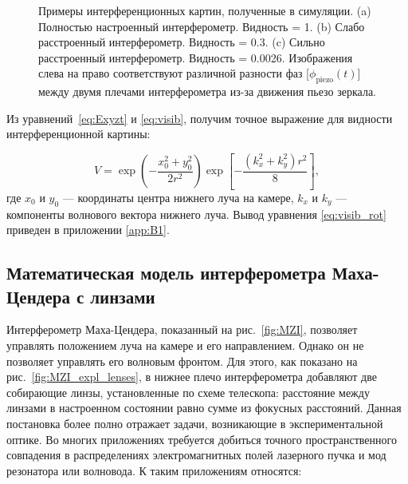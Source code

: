 \begin{figure}[ht]
\caption{Примеры интерференционных картин, полученные в симуляции. (a) Полностью настроенный интерферометр. Видность = 1. (b) Слабо расстроенный интерферометр. Видность = 0.3. (c) Сильно расстроенный интерферометр. Видность =
0.0026. Изображения слева на право соответствуют различной разности фаз [$\phi_{\mathrm{piezo}}(t)$] между двумя плечами интерферометра из-за движения пьезо зеркала.}
\label{fig:visib_expl}
\end{figure}


Из уравнений~\eqref{eq:Exyzt} и \eqref{eq:visib}, получим точное выражение для видности интерференционной картины:

\begin{equation}
    V = \exp\left(- \frac{x_0^2 + y_0^2}{2 r^2}\right)  \exp\left[- \frac{(k_x^2 + k_y^2) r^2}{8}\right],
    \label{eq:visib_rot}
\end{equation}
где $x_0$ и $y_0$ --- координаты центра нижнего луча на камере, $k_x$ и $k_y$ --- компоненты волнового вектора нижнего луча. Вывод уравнения \eqref{eq:visib_rot} приведен в приложении \ref{app:B1}.

\subsection{Математическая модель интерферометра Маха-Цендера с линзами}\label{sec:ch2/sec1/subsec4}

Интерферометр Маха-Цендера, показанный на рис.~\ref{fig:MZI}, позволяет управлять положением луча на камере и его направлением. Однако он не позволяет управлять его волновым фронтом. Для этого, как показано на рис.~\ref{fig:MZI_expl_lenses}, в нижнее плечо интерферометра добавляют две собирающие линзы, установленные по схеме телескопа: расстояние между линзами в настроенном состоянии равно сумме из фокусных расстояний. Данная постановка более полно отражает задачи, возникающие в экспериментальной оптике. Во многих приложениях требуется добиться точного пространственного совпадения в распределениях электромагнитных полей лазерного пучка и мод резонатора или волновода. К таким приложениям относятся: 

